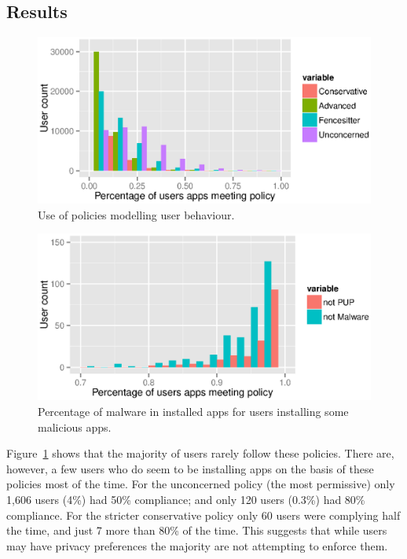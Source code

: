 \documentclass[]{soups-poster}
\begin{document}
\subsection{Results}

\begin{figure}[!ht]\centering
  \includegraphics[width=0.90\linewidth]{./tables/lin.eps}
  \caption{Use of policies modelling user behaviour.}
  \label{fig:lin}
\end{figure}

\begin{figure}[!ht]\centering
  \includegraphics[width=0.85\linewidth]{./tables/malware.eps}
  \caption{Percentage of malware in installed apps for users installing some malicious apps.}
  \label{fig:malware}
\end{figure}

Figure~\ref{fig:lin} shows that the majority of users rarely follow these policies.
There are, however, a few users who do seem to be installing apps on the basis of these policies most of the time.
For the unconcerned policy (the most permissive) only 1,606 users (4\%) had 50\% compliance;
  and only 120 users (0.3\%) had 80\% compliance.
For the stricter conservative policy only 60 users were complying half the time, and just 7 more than 80\% of the time.
This suggests that while users may have privacy preferences the majority are not attempting to enforce them.
\end{document}
